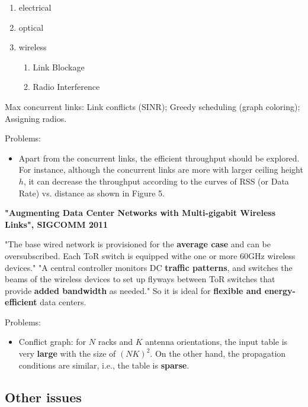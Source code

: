 \documentclass[journal,onecolumn,11pt]{IEEEtran}
\begin{document}

\begin{enumerate}
  \item electrical
  \item optical
  \item wireless
  \begin{enumerate}
    \item Link Blockage
    \item Radio Interference
  \end{enumerate}
\end{enumerate}

Max concurrent links: Link conflicts (SINR); Greedy scheduling (graph coloring); Assigning radios.

Problems:
\begin{itemize}
  \item Apart from the concurrent links, the efficient throughput should be explored. For instance, although the concurrent links are more with larger ceiling height $h$, it can decrease the throughput according to the curves of RSS (or Data Rate) vs. distance as shown in Figure 5.
\end{itemize}

\textbf{"Augmenting Data Center Networks with Multi-gigabit Wireless Links", SIGCOMM 2011}

"The base wired network is provisioned for the \textbf{average case} and can be oversubscribed. Each ToR switch is equipped withe one or more 60GHz wireless devices." "A central controller monitors DC \textbf{traffic patterns}, and switches the beams of the wireless devices to set up flyways between ToR switches that provide \textbf{added bandwidth} as needed." So it is ideal for \textbf{flexible and energy-efficient} data centers.

Problems:
\begin{itemize}
  \item Conflict graph: for $N$ racks and $K$ antenna orientations, the input table is very \textbf{large} with the size of $(NK)^2$. On the other hand, the propagation conditions are similar, i.e., the table is \textbf{sparse}.
\end{itemize}

\subsection{Other issues}
\end{document}
